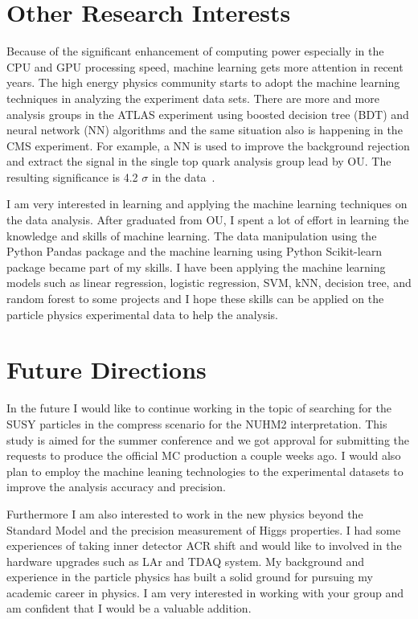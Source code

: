 \documentclass[12pt]{article}
\begin{document}
\section{Other Research Interests}
Because of the significant enhancement of computing power especially in the CPU and GPU processing speed, machine learning gets more attention in recent years. 
The high energy physics community starts to adopt the machine learning techniques in analyzing the experiment data sets.
There are more and more analysis groups in the ATLAS experiment using boosted decision tree (BDT) and neural network (NN) algorithms and the same situation also is happening in the CMS experiment.
For example, a NN is used to improve the background rejection and extract the signal in the single top quark analysis group lead by OU. The resulting significance is 4.2 $\sigma$ in the data~\cite{Aaboud:2017ylb}.

I am very interested in learning and applying the machine learning techniques on the  data analysis.
After graduated from OU, I spent a lot of effort in learning the knowledge and skills of  machine learning.
The data manipulation using the Python Pandas package and the machine learning using Python Scikit-learn package became part of my skills.
I have been applying the machine learning models such as linear regression, logistic regression, SVM, kNN, decision tree, and random forest to some projects and I hope these skills can be applied on the particle physics experimental data to help the analysis.


\section{Future Directions}
In the future I would like to continue working in the topic of searching for the SUSY particles in the compress scenario for the NUHM2 interpretation.
This study is aimed for the summer conference and we got approval for submitting the requests to produce the official MC production a couple weeks ago.
I would also plan to employ the machine leaning technologies to the experimental datasets to improve the analysis accuracy and precision.

Furthermore I am also interested to work in the new physics beyond the Standard Model and the precision measurement of Higgs properties.
I had some experiences of taking inner detector ACR shift and would like to  involved in the hardware upgrades such as LAr and TDAQ system.
%
My background and experience in the particle physics has built a solid ground for pursuing my academic career in physics.
I am very interested in working with your group and am confident that I would be a valuable addition.
\end{document}

